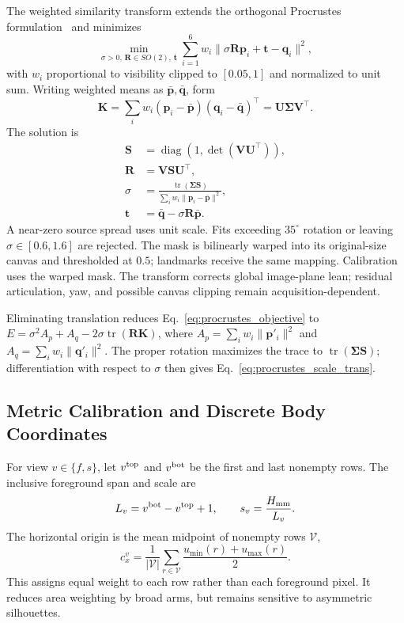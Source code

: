 \documentclass[11pt,a4paper]{article}
\numberwithin{equation}{section}
\begin{document}
The weighted similarity transform extends the orthogonal Procrustes formulation~\cite{schonemann1966generalized} and minimizes
\begin{equation}
\min_{\sigma>0,\,\mathbf R\in SO(2),\,\mathbf t}
\sum_{i=1}^{6}w_i\|\sigma\mathbf R\mathbf p_i+\mathbf t-\mathbf q_i\|^2,
\label{eq:procrustes_objective}
\end{equation}
with $w_i$ proportional to visibility clipped to $[0.05,1]$ and normalized to unit sum. Writing weighted means as $\bar{\mathbf p},\bar{\mathbf q}$, form
\begin{equation}
\mathbf K=\sum_iw_i(\mathbf p_i-\bar{\mathbf p})(\mathbf q_i-\bar{\mathbf q})^\top
=\mathbf U\mathbf\Sigma\mathbf V^\top.
\label{eq:svd_cov}
\end{equation}
The solution is
\begin{align}
\mathbf S&=\operatorname{diag}(1,\det(\mathbf V\mathbf U^\top)),\nonumber\\
\mathbf R&=\mathbf V\mathbf S\mathbf U^\top,\label{eq:rotation}\\
\sigma&=\frac{\operatorname{tr}(\mathbf\Sigma\mathbf S)}{\sum_iw_i\|\mathbf p_i-\bar{\mathbf p}\|^2},\label{eq:procrustes_scale_trans}\\
\mathbf t&=\bar{\mathbf q}-\sigma\mathbf R\bar{\mathbf p}.\nonumber
\end{align}
A near-zero source spread uses unit scale. Fits exceeding $35^\circ$ rotation or leaving $\sigma\in[0.6,1.6]$ are rejected. The mask is bilinearly warped into its original-size canvas and thresholded at $0.5$; landmarks receive the same mapping. Calibration uses the warped mask. The transform corrects global image-plane lean; residual articulation, yaw, and possible canvas clipping remain acquisition-dependent.

Eliminating translation reduces Eq.~\eqref{eq:procrustes_objective} to $E=\sigma^2 A_p+A_q-2\sigma\operatorname{tr}(\mathbf R\mathbf K)$, where $A_p=\sum_iw_i\|\mathbf p'_i\|^2$ and $A_q=\sum_iw_i\|\mathbf q'_i\|^2$. The proper rotation maximizes the trace to $\operatorname{tr}(\mathbf\Sigma\mathbf S)$; differentiation with respect to $\sigma$ then gives Eq.~\eqref{eq:procrustes_scale_trans}.

\subsection{Metric Calibration and Discrete Body Coordinates}
\label{subsec:calibration}
For view $v\in\{f,s\}$, let $v^{\rm top}$ and $v^{\rm bot}$ be the first and last nonempty rows. The inclusive foreground span and scale are
\begin{equation}
L_v=v^{\rm bot}-v^{\rm top}+1,\qquad s_v=\frac{H_{\rm mm}}{L_v}.
\label{eq:scale_front}
\end{equation}
The horizontal origin is the mean midpoint of nonempty rows $\mathcal V$,
\begin{equation}
c_x^v=\frac{1}{|\mathcal V|}\sum_{r\in\mathcal V}\frac{u_{\min}(r)+u_{\max}(r)}{2}.
\label{eq:centerline}
\end{equation}
This assigns equal weight to each row rather than each foreground pixel. It reduces area weighting by broad arms, but remains sensitive to asymmetric silhouettes.
\end{document}
